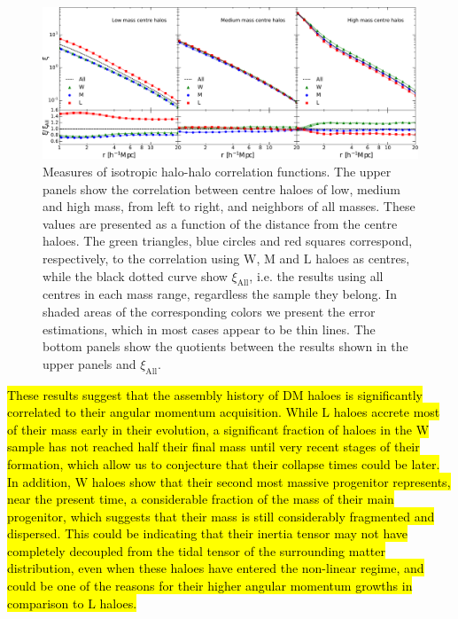 \documentclass[fleqn,usenatbib]{mnras}
\newcommand{\Wh}{\mathrm{W}}
\newcommand{\Lh}{\mathrm{L}}
\newcommand{\Mh}{\mathrm{M}}
\begin{document}
\begin{figure}
	\includegraphics[width=2\columnwidth]{400Mpc_figs/panel_M123_iso_color.pdf}
    \caption{Measures of isotropic halo-halo correlation functions. The upper panels show the correlation between centre haloes of low, medium and high mass, from left to right, and neighbors of all masses. These values are presented as a function of the distance from the centre haloes. The green triangles, blue circles and red squares correspond, respectively, to the correlation using $\Wh$, $\Mh$ and $\Lh$ haloes as centres, while the black dotted curve show $\xi_\mathrm{All}$, i.e. the results using all centres in each mass range, regardless the sample they belong. In shaded areas of the corresponding colors we present the error estimations, which in most cases appear to be thin lines. The bottom panels show the quotients between the results shown in the upper panels and $\xi_\mathrm{All}$.}
    \label{fig:iso_M123}
\end{figure}

\hl{These results suggest that the assembly history of DM haloes is significantly correlated to their angular momentum acquisition. While $\Lh$ haloes accrete most of their mass early in their evolution, a significant fraction of haloes in the $\Wh$ sample has not reached half their final mass until very recent stages of their formation, which allow us to conjecture that their collapse times could be later.
In addition, $\Wh$ haloes show that their second most massive progenitor represents, near the present time, a considerable fraction of the mass of their main progenitor, which suggests that their mass is still considerably fragmented and dispersed. This could be indicating that their inertia tensor may not have completely decoupled from the tidal tensor of the surrounding matter distribution, even when these haloes have entered the non-linear regime, and could be one of the reasons for their higher angular momentum growths in comparison to $\Lh$ haloes.}
\end{document}
